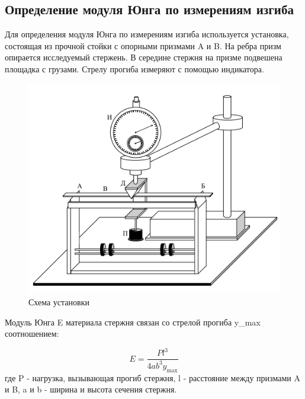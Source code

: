 \documentclass[a4paper, 12pt]{article}
\begin{document}
\newpage

\subsection{Определение модуля Юнга по измерениям изгиба}
Для определения модуля Юнга по измерениям изгиба используется установка, состоящая из прочной стойки с опорными призмами A и B. На ребра призм опирается исследуемый стержень. В середине стержня на призме подвешена площадка с грузами. Стрелу прогиба измеряют с помощью индикатора.

\begin{figure}[h]
\centering
\includegraphics[width=0.5\linewidth]{схема установки.png}
\caption{Схема установки}
\label{fig:voltage_current}
\end{figure}

Модуль Юнга E материала стержня связан со стрелой прогиба y_max соотношением:

\[ E = \frac{P l^3}{4ab^3 y_{\max}} \]
где P - нагрузка, вызывающая прогиб стержня, l - расстояние между призмами A и B, a и b - ширина и высота сечения стержня.
\end{document}
